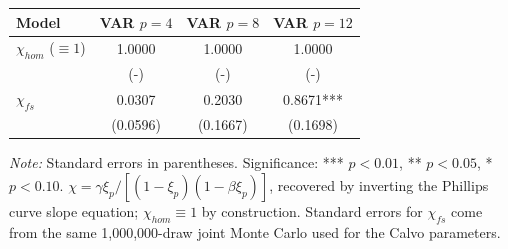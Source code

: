 \begin{table}[htpb]
    \centering
    \scriptsize
    \begin{tabular}{lccc}
    \toprule
    \textbf{Model} & \textbf{VAR $p=4$} & \textbf{VAR $p=8$} & \textbf{VAR $p=12$} \\
    \midrule
    $\chi_{hom}$ ($\equiv 1$) & 1.0000 & 1.0000 & 1.0000 \\
    & (-) & (-) & (-) \\
    \midrule
    $\chi_{fs}$ & 0.0307 & 0.2030 & 0.8671*** \\
    & (0.0596) & (0.1667) & (0.1698) \\
    \bottomrule
    \end{tabular}

    \vspace{0.15cm}
    \centering
    \tiny{\textit{Note:} Standard errors in parentheses. Significance: *** $p<0.01$, ** $p<0.05$, * $p<0.10$. $\chi = \gamma\xi_p / [(1-\xi_p)(1-\beta\xi_p)]$, recovered by inverting the Phillips curve slope equation; $\chi_{hom} \equiv 1$ by construction. Standard errors for $\chi_{fs}$ come from the same 1{,}000{,}000-draw joint Monte Carlo used for the Calvo parameters.}
\end{table}
